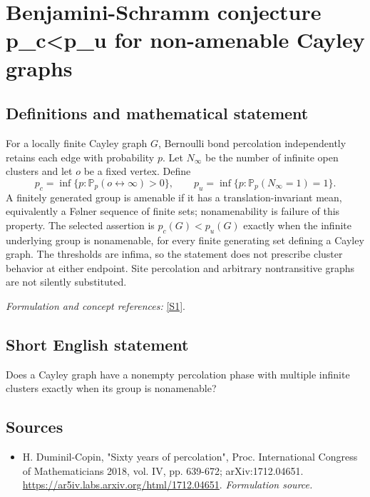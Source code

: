 \documentclass[11pt]{article}
\begin{document}
\section*{\texorpdfstring{Benjamini-Schramm conjecture p\_c<p\_u for non-amenable Cayley graphs}{Benjamini-Schramm conjecture p\_c<p\_u for non-amenable Cayley graphs}}\label{statement}
\subsection{Definitions and mathematical statement}
For a locally finite Cayley graph $G$, Bernoulli bond percolation independently retains each edge with probability $p$. Let $N_\infty$ be the number of infinite open clusters and let $o$ be a fixed vertex. Define
\[
 p_c=\inf\{p:{\mathbb{P}}_p(o\leftrightarrow\infty)>0\},\qquad
 p_u=\inf\{p:{\mathbb{P}}_p(N_\infty=1)=1\}.
\]
A finitely generated group is amenable if it has a translation-invariant mean, equivalently a F\o lner sequence of finite sets; nonamenability is failure of this property. The selected assertion is $p_c(G)<p_u(G)$ exactly when the infinite underlying group is nonamenable, for every finite generating set defining a Cayley graph. The thresholds are infima, so the statement does not prescribe cluster behavior at either endpoint. Site percolation and arbitrary nontransitive graphs are not silently substituted.
\par\smallskip\textit{Formulation and concept references:} \href{https://ar5iv.labs.arxiv.org/html/1712.04651}{[S1]}.

\subsection{Short English statement}
Does a Cayley graph have a nonempty percolation phase with multiple infinite clusters exactly when its group is nonamenable?
\subsection{Sources}
\begin{itemize}
\item[S1]H. Duminil-Copin, "Sixty years of percolation", Proc. International Congress of Mathematicians 2018, vol. IV, pp. 639-672; arXiv:1712.04651.
\url{https://ar5iv.labs.arxiv.org/html/1712.04651}.
\textit{Formulation source.}
\end{itemize}
\end{document}
